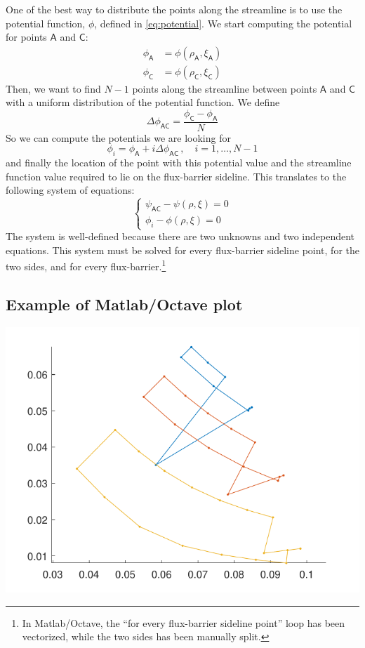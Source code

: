 \documentclass[b5paper,11pt,oneside,fleqn]{article}
\newcommand{\pt}[1]{\mathsf{#1}}
\begin{document}
One of the best way to distribute the points along the streamline is to use the 
potential function, $ \phi $, defined in \autoref{eq:potential}.
We start computing the potential for points $ \pt{A} $ and $ \pt{C} $:
\begin{equation*}
\begin{aligned}
\phi_\pt{A} &= \phi(\rho_\pt{A}, \xi_\pt{A}) \\
\phi_\pt{C} &= \phi(\rho_\pt{C}, \xi_\pt{C}) 
\end{aligned}
\end{equation*}
Then, we want to find $ N-1 $ points along the streamline
between points $ \pt{A} $ and $ \pt{C} $
with a uniform distribution of the potential function.
We define
\begin{equation*}
\Delta\phi_{\pt{AC}} = \frac{\phi_\pt{C} - \phi_\pt{A}}{N}
\end{equation*}
So we can compute the potentials we are looking for
\[
\phi_i = \phi_\pt{A} + i \Delta\phi_{\pt{AC}} \,,\quad i=1,\ldots,N-1
\]
and finally the location of the point with this potential value and the 
streamline function value required to lie on the flux-barrier sideline.
This translates to the following system of equations:
\begin{equation}
\begin{cases}
\psi_{\pt{AC}} - \psi(\rho,\xi) = 0 \\
\phi_i - \phi(\rho,\xi) = 0
\end{cases}
\end{equation}
The system is well-defined because there are two unknowns and two independent 
equations. This system must be solved for every flux-barrier sideline point, 
for the two sides, and for every flux-barrier.\footnote{In Matlab/Octave, the 
``for every flux-barrier sideline point'' loop has been vectorized, while the 
two sides has been manually split.}



\subsection{Example of Matlab/Octave plot}

\includegraphics[width=0.75\linewidth]{gfx/MatlabOutput}
\end{document}
